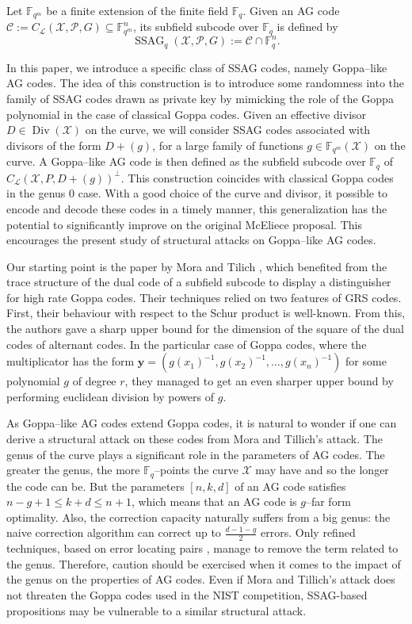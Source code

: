 \documentclass[a4paper]{article}
\theoremstyle{definition}
\theoremstyle{remark}
\newcommand{\calP}{\mathcal{P}}
\newcommand{\calL}{\mathcal{L}}
\newcommand{\calC}{\mathcal{C}}
\newcommand{\calX}{\mathcal{X}}
\newcommand{\fqm}{\mathbb{F}_{q^m}}
\newcommand{\fq}{\mathbb{F}_{q}}
\newcommand{\F}{\mathbb{F}}
\newcommand{\Div}{\operatorname{Div}}
\newcommand{\ssag}[1]{\operatorname{SSAG}_{q}\left(#1\right)}
\begin{document}
\medskip

Let $\fqm$ be a finite extension of the finite field $\fq$. Given an AG code $\calC :=C_{\calL}(\calX,\calP,G) \subseteq \fqm^n$, its subfield subcode over $\fq$ is defined by 
$$\ssag{\calX,\calP,G} := \calC \cap \fq^n.$$  

In this paper, we introduce a specific class of SSAG codes, namely Goppa--like AG codes. The idea of this construction is to introduce  some randomness into the family of SSAG codes drawn as private key by mimicking the role of the Goppa polynomial in the case of classical Goppa codes. Given an effective divisor $D\in \Div(\calX)$ on the curve, we will consider SSAG codes associated with divisors of the form $D+(g)$, for a large family of functions $g \in \fqm(\calX)$ on the curve. A Goppa--like AG code is then defined as the subfield subcode over $\fq$ of $C_{\calL}(\calX,P,D+(g))^{\perp}$. This construction coincides with classical Goppa codes in the genus 0 case.%
With a good choice of the curve and divisor, it possible to encode and decode these codes in a timely manner, this generalization has the potential to significantly improve on the original McEliece proposal. This encourages the present study of structural attacks on Goppa--like AG codes. 

Our starting point is the paper by Mora and Tilich \cite{MT21}, which benefited from the trace structure of the dual code of a subfield subcode to display a distinguisher for high rate Goppa codes. Their techniques relied on two features of GRS codes. First, their behaviour with respect to the Schur product is well-known. From this, the authors gave a sharp upper bound for the dimension of the square of the dual codes of alternant codes. In the particular case of Goppa codes, where the multiplicator has the form $\mathbf{y}=(g(x_1)^{-1},g(x_2)^{-1},\dots,g(x_n)^{-1})$ for some polynomial $g$ of degree $r$, they managed to get an even sharper upper bound by performing euclidean division by powers of $g$.

As Goppa--like AG codes extend Goppa codes, it is natural to wonder if one can derive a structural attack on these codes from Mora and Tillich's attack. The genus of the curve plays a significant role in the parameters of AG codes. The greater the genus, the more $\F_q$--points the curve $\calX$ may have and so the longer the code can be. But the parameters $[n,k,d]$ of an AG code satisfies $n-g+1 \leq k+d \leq n+1$, which means that an AG code is $g$--far form optimality. Also, the correction capacity naturally suffers from a big genus: the naive correction algorithm can correct up to $\frac{d-1-g}{2}$ errors. Only refined techniques, based on error locating pairs \cite{CP20}, manage to remove the term related to the genus. Therefore, caution should be exercised when it comes to the impact of the genus on the properties of AG codes.
Even if Mora and Tillich's attack does not threaten the Goppa codes used in the NIST competition, SSAG-based propositions may be vulnerable to a similar structural attack. 
\end{document}
